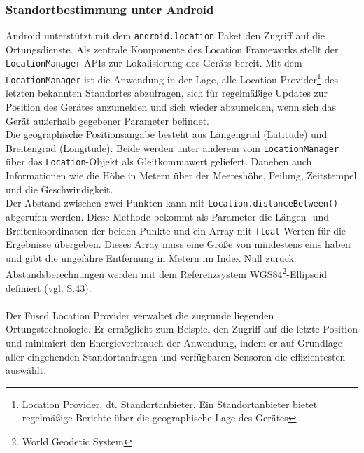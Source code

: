 \subsubsection{Standortbestimmung unter Android}
Android unterstützt mit dem \texttt{android.location} Paket den Zugriff auf die Ortungsdienste. Als zentrale Komponente des Location Frameworks stellt der \texttt{LocationManager} \glspl{API} zur Lokalisierung des Geräts bereit. Mit dem \texttt{LocationManager} ist die Anwendung in der Lage, alle Location Provider\footnote{ Location Provider, dt. Standortanbieter. Ein Standortanbieter bietet regelmäßige Berichte über die geographische Lage des Gerätes} des letzten bekannten Standortes abzufragen, sich für regelmäßige Updates zur Position des Gerätes anzumelden und sich wieder abzumelden, wenn sich das Gerät außerhalb gegebener Parameter befindet. \cite{android_gps} \\
Die geographische Positionsangabe besteht aus Längengrad (Latitude) und Breitengrad (Longitude). Beide werden unter anderem vom \texttt{LocationManager} über das \texttt{Location}-Objekt als Gleitkommawert geliefert. Daneben auch Informationen wie die Höhe in Metern über der Meereshöhe, Peilung, Zeitstempel und die Geschwindigkeit.\\
Der Abstand zwischen zwei Punkten kann mit \texttt{Location.distanceBetween()} abgerufen werden. Diese Methode bekommt als Parameter die Längen- und Breitenkoordinaten der beiden Punkte und ein Array mit \texttt{float}-Werten für die Ergebnisse übergeben. Dieses Array muss eine Größe von mindestens eins haben und gibt die ungefähre Entfernung in Metern im Index Null zurück. Abstandsberechnungen werden mit dem Referenzsystem WGS84\footnote{ World Geodetic System}-Ellipsoid definiert (vgl. \cite{location} S.43). 
\\\\
Der Fused Location Provider verwaltet die zugrunde liegenden Ortungstechnologie. Er ermöglicht zum Beispiel den Zugriff auf die letzte Position und minimiert den Energieverbrauch der Anwendung, indem er auf Grundlage aller eingehenden Standortanfragen und verfügbaren Sensoren die effizientesten auswählt. \cite{android_fused}
\clearpage
